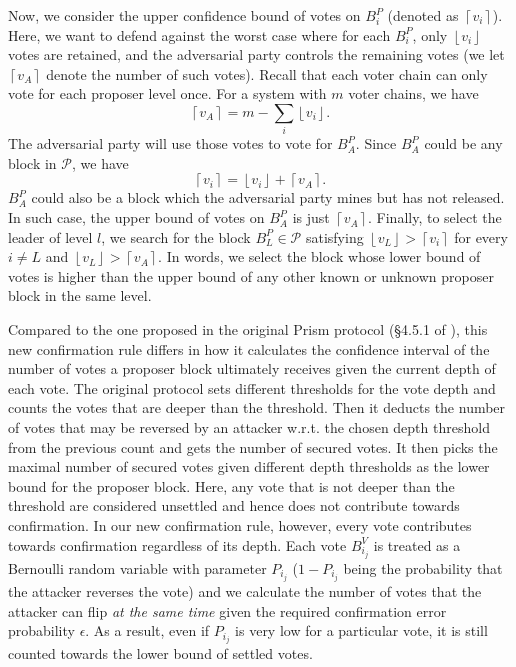 Now, we consider the upper confidence bound of votes on $B_i^P$ (denoted as $\left \lceil v_{i} \right \rceil$). Here, we want to defend against the worst case where for each $B_i^P$, only $\left \lfloor v_{i} \right \rfloor$ votes are retained, and the adversarial party controls the remaining votes (we let $\left \lceil v_A \right \rceil$ denote the number of such votes). Recall that each voter chain can only vote for each proposer level once. For a system with $m$ voter chains, we have
$$\left \lceil v_A \right \rceil = m - \sum_{i}\left \lfloor v_{i} \right \rfloor.$$
The adversarial party will use those votes to vote for $B^P_A$. Since $B^P_A$ could be any block in $\mathcal P$, we have
$$\left \lceil v_i \right \rceil = \left \lfloor v_{i} \right \rfloor + \left \lceil v_A \right \rceil.$$
$B^P_A$ could also be a block which the adversarial party mines but has not released. In such case, the upper bound of votes on $B^P_A$ is just $\left \lceil v_A \right \rceil$. Finally, to select the leader of level $l$, we search for the block $B^P_L \in \mathcal P$ satisfying $\left \lfloor v_{L} \right \rfloor > \left \lceil v_i \right \rceil$ for every $i \neq L$ and $\left \lfloor v_{L} \right \rfloor > \left \lceil v_A \right \rceil$. In words, we select the block whose lower bound of votes is higher than the upper bound of any other known or unknown proposer block in the same level.

Compared to the one proposed in the original Prism protocol (\S4.5.1 of \cite{prism-theory}), this new confirmation rule differs in how it calculates the confidence interval of the number of votes a proposer block ultimately receives given the current depth of each vote. The original protocol sets different thresholds for the vote depth and counts the votes that are deeper than the threshold. Then it deducts the number of votes that may be reversed by an attacker w.r.t. the chosen depth threshold from the previous count and gets the number of secured votes. It then picks the maximal number of secured votes given different depth thresholds as the lower bound for the proposer block. Here, any vote that is not deeper than the threshold are considered unsettled and hence does not contribute towards confirmation. In our new confirmation rule, however, every vote contributes towards confirmation regardless of its depth. Each vote $B^V_{i_j}$ is treated as a Bernoulli random variable with parameter $P_{i_j}$ ($1-P_{i_j}$ being the probability that the attacker reverses the vote) and we calculate the number of votes that the attacker can flip \textit{at the same time} given the required confirmation error probability $\epsilon$. As a result, even if $P_{i_j}$ is very low for a particular vote, it is still counted towards the lower bound of settled votes.


